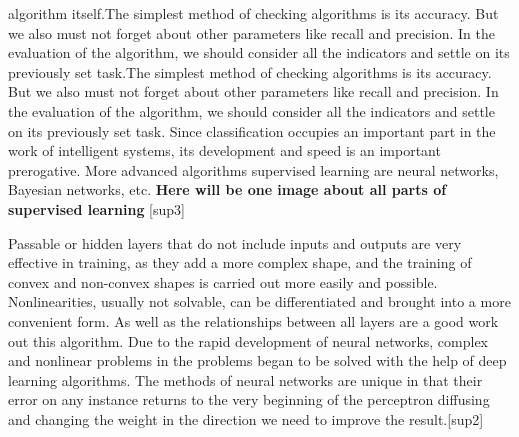 algorithm itself.The simplest method of checking algorithms is its accuracy. But we also must not forget about other parameters like recall and precision. In the evaluation of the algorithm, we should consider all the indicators and settle on its previously set task.The simplest method of checking algorithms is its accuracy. But we also must not forget about other parameters like recall and precision. In the evaluation of the algorithm, we should consider all the indicators and settle on its previously set task. Since classification occupies an important part in the work of intelligent systems, its development and speed is an important prerogative. More advanced algorithms supervised learning are neural networks, Bayesian networks, etc. \textbf{Here will be one image about all parts of supervised learning} [sup3]


\vspace{-0.5cm}
\noindent Passable or hidden layers that do not include inputs and outputs are very effective in training, as they add a more complex shape, and the training of convex and non-convex shapes is carried out more easily and possible. Nonlinearities, usually not solvable, can be differentiated and brought into a more convenient form. As well as the relationships between all layers are a good work out this algorithm. Due to the rapid development of neural networks, complex and nonlinear problems in the problems began to be solved with the help of deep learning algorithms. The methods of neural networks are unique in that their error on any instance returns to the very beginning of the perceptron diffusing and changing the weight in the direction we need to improve the result.[sup2]
\vspace{-0.3cm}
 
 
\vspace{-0.5cm}
\noindent 




